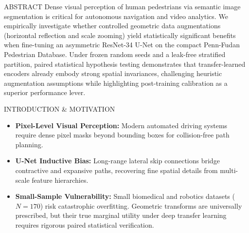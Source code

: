 \documentclass[10pt]{article}
\begin{document}
\noindent
\begin{minipage}[t]{0.285\textwidth}
    \begin{bwcard}{ABSTRACT}
    {\fontsize{7.2}{8.8}\selectfont
    Dense visual perception of human pedestrians via semantic image segmentation is critical for autonomous navigation and video analytics. We empirically investigate whether controlled geometric data augmentations (horizontal reflection and scale zooming) yield statistically significant benefits when fine-tuning an asymmetric ResNet-34 U-Net on the compact Penn-Fudan Pedestrian Database. Under frozen random seeds and a leak-free stratified partition, paired statistical hypothesis testing demonstrates that transfer-learned encoders already embody strong spatial invariances, challenging heuristic augmentation assumptions while highlighting post-training calibration as a superior performance lever.
    }
    \end{bwcard}

    \vspace{0.03in}

    \begin{bwcard}{INTRODUCTION \& MOTIVATION}
    {\fontsize{7.2}{8.8}\selectfont
    \begin{itemize}\setlength{\itemsep}{1.5pt}\setlength{\leftmargin}{10pt}\setlength{\parskip}{0pt}
        \item \textbf{Pixel-Level Visual Perception:} Modern automated driving systems require dense pixel masks beyond bounding boxes for collision-free path planning.
        \item \textbf{U-Net Inductive Bias:} Long-range lateral skip connections bridge contractive and expansive paths, recovering fine spatial details from multi-scale feature hierarchies.
        \item \textbf{Small-Sample Vulnerability:} Small biomedical and robotics datasets ($N=170$) risk catastrophic overfitting. Geometric transforms are universally prescribed, but their true marginal utility under deep transfer learning requires rigorous paired statistical verification.
    \end{itemize}
    }
    \end{bwcard}


\end{minipage}
\end{document}
